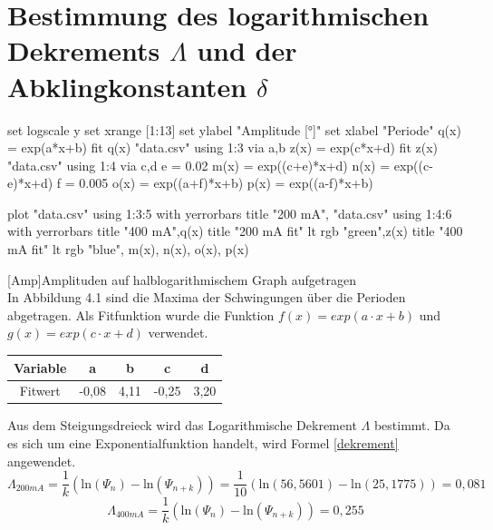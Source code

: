 \documentclass[12pt,a4paper,]{scrreprt}
\begin{document}
    \section{Bestimmung des logarithmischen Dekrements $\Lambda$ und der Abklingkonstanten $\delta$}
    	\begin{gnuplot}[terminal=pdf,terminaloptions={font ",10" linewidth 3},scale=1.2]
        	set logscale y
            set xrange [1:13]
            set ylabel "Amplitude [°]"
            set xlabel "Periode"
            q(x) = exp(a*x+b)
            fit q(x) "data.csv" using 1:3 via a,b
            z(x) = exp(c*x+d)
            fit z(x) "data.csv" using 1:4 via c,d
            e = 0.02
            m(x) = exp((c+e)*x+d)
            n(x) = exp((c-e)*x+d)
            f = 0.005
            o(x) = exp((a+f)*x+b)
            p(x) = exp((a-f)*x+b)
           
			plot "data.csv" using 1:3:5 with yerrorbars title "200 mA", "data.csv" using 1:4:6 with yerrorbars title "400 mA",q(x) title "200 mA fit" lt rgb "green",z(x) title "400 mA fit" lt rgb "blue", m(x), n(x), o(x), p(x)
		\end{gnuplot}
        [Amp]{Amplituden auf halblogarithmischem Graph aufgetragen}
        \ \\
        In Abbildung 4.1 sind die Maxima der Schwingungen über die Perioden abgetragen. Als Fitfunktion wurde die Funktion $f(x) = exp(a \cdot x + b)$ und $g(x) = exp(c \cdot x + d)$ verwendet. 
        \begin{center}
        
        \begin{tabular}{c||c|c|c|c}
			Variable & a & b & c & d \\ \hline
            Fitwert &  -0,08  & 4,11  & -0,25  &  3,20 
        \end{tabular}
        
        \end{center}
        Aus dem Steigungsdreieck wird das Logarithmische Dekrement $\Lambda$ bestimmt. Da es sich um eine Exponentialfunktion handelt, wird Formel \ref{dekrement} angewendet.
        \begin{equation}
        	\Lambda_{200mA} = \frac{1}{k} (\text{ln}(\Psi_n) - \text{ln}(\Psi_{n+k})) = \frac{1}{10} (\text{ln}(56,5601) - \text{ln}(25,1775)) = 0,081
        \end{equation}
         \begin{equation}
        	\Lambda_{400mA} = \frac{1}{k} (\text{ln}(\Psi_n) - \text{ln}(\Psi_{n+k})) = 0,255
        \end{equation}
\end{document}
